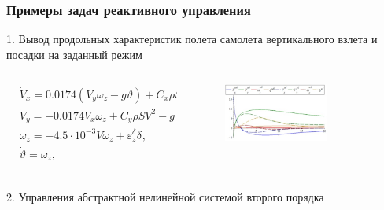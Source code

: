 \documentclass[default]{beamer}
\begin{document}
	\begin{frame}
		\frametitle{Примеры задач реактивного управления}

		1. Вывод продольных характеристик полета самолета вертикального взлета и посадки на заданный режим
		\begin{columns}
			\begin{column}{0.6\textwidth}
				\begingroup
				\fontsize{7pt}{7pt}\selectfont
					\[\begin{matrix}
					& {{{\dot{V}}}_{x}}=0.0174({{V}_{y}}{{\omega }_{z}}-g\vartheta )+{{C}_{x}}\rho S{{V}^{2}}+2\cdot {{10}^{-4}}{{P}_{}}+1.15\cdot {{10}^{-3}}{{P}_{}}, \\ 
					& {{{\dot{V}}}_{y}}=-0.0174{{V}_{x}}{{\omega }_{z}}+{{C}_{y}}\rho S{{V}^{2}}-g+1.14\cdot {{10}^{-3}}{{P}_{}}, \\ 
					& {{{\dot{\omega }}}_{z}}=-4.5\cdot {{10}^{-3}}V{{\omega }_{z}}+\varepsilon _{z}^{{{\delta }_{}}}{{\delta }_{}}, \\ 
					& \dot{\vartheta }={{\omega }_{z}}, \\ 
					\end{matrix}\]
				\endgroup				
			\end{column}
			\begin{column}{0.4\textwidth}
				\begin{figure}
					\includegraphics[width=0.7\textwidth]{control_res_1.jpg}
				\end{figure}
			\end{column}
		\end{columns}
		
		2. Управления абстрактной нелинейной системой второго порядка 
		

\end{frame}
\end{document}
